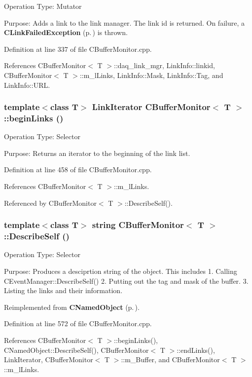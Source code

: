 Operation Type: Mutator

Purpose: Adds a link to the link manager. The link id is returned. On failure, a {\bf CLink\-Failed\-Exception} {\rm (p.\,\pageref{classCLinkFailedException})} is thrown. 

Definition at line 337 of file CBuffer\-Monitor.cpp.

References CBuffer\-Monitor$<$ T $>$::daq\_\-link\_\-mgr, Link\-Info::linkid, CBuffer\-Monitor$<$ T $>$::m\_\-l\-Links, Link\-Info::Mask, Link\-Info::Tag, and Link\-Info::URL.
\subsubsection{\setlength{\rightskip}{0pt plus 5cm}template$<$class T$>$ {\bf Link\-Iterator} CBuffer\-Monitor$<$ T $>$::begin\-Links ()}\label{classCBufferMonitor_a12}


Operation Type: Selector

Purpose: Returns an iterator to the beginning of the link list. 

Definition at line 458 of file CBuffer\-Monitor.cpp.

References CBuffer\-Monitor$<$ T $>$::m\_\-l\-Links.

Referenced by CBuffer\-Monitor$<$ T $>$::Describe\-Self().
\subsubsection{\setlength{\rightskip}{0pt plus 5cm}template$<$class T$>$ string CBuffer\-Monitor$<$ T $>$::Describe\-Self ()\hspace{0.3cm}{\tt  [virtual]}}\label{classCBufferMonitor_a17}


Operation Type: Selector

Purpose: Produces a desciprtion string of the object. This includes 1. Calling CEvent\-Manager::Describe\-Self() 2. Putting out the tag and mask of the buffer. 3. Listing the links and their information. 

Reimplemented from {\bf CNamed\-Object} {\rm (p.\,\pageref{classCNamedObject_a8})}.

Definition at line 572 of file CBuffer\-Monitor.cpp.

References CBuffer\-Monitor$<$ T $>$::begin\-Links(), CNamed\-Object::Describe\-Self(), CBuffer\-Monitor$<$ T $>$::end\-Links(), Link\-Iterator, CBuffer\-Monitor$<$ T $>$::m\_\-Buffer, and CBuffer\-Monitor$<$ T $>$::m\_\-l\-Links.
